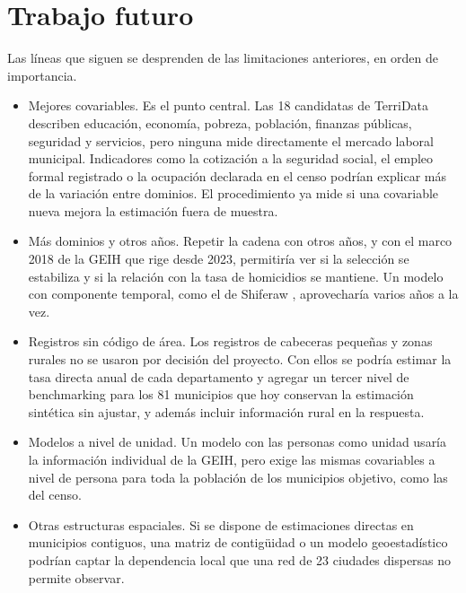 \section{Trabajo futuro}
\label{sec:dis_futuro}

Las líneas que siguen se desprenden de las limitaciones anteriores, en orden de importancia.

\begin{itemize}
    \item Mejores covariables. Es el punto central. Las 18 candidatas de TerriData describen educación, economía, pobreza, población, finanzas públicas, seguridad y servicios, pero ninguna mide directamente el mercado laboral municipal. Indicadores como la cotización a la seguridad social, el empleo formal registrado o la ocupación declarada en el censo podrían explicar más de la variación entre dominios. El procedimiento ya mide si una covariable nueva mejora la estimación fuera de muestra.
    \item Más dominios y otros años. Repetir la cadena con otros años, y con el marco 2018 de la GEIH que rige desde 2023, permitiría ver si la selección se estabiliza y si la relación con la tasa de homicidios se mantiene. Un modelo con componente temporal, como el de Shiferaw \cite[p.~4]{Shiferaw2025}, aprovecharía varios años a la vez.
    \item Registros sin código de área. Los registros de cabeceras pequeñas y zonas rurales no se usaron por decisión del proyecto. Con ellos se podría estimar la tasa directa anual de cada departamento y agregar un tercer nivel de benchmarking para los 81 municipios que hoy conservan la estimación sintética sin ajustar, y además incluir información rural en la respuesta.
    \item Modelos a nivel de unidad. Un modelo con las personas como unidad \cite{BatteseHarterFuller1988} usaría la información individual de la GEIH, pero exige las mismas covariables a nivel de persona para toda la población de los municipios objetivo, como las del censo.
    \item Otras estructuras espaciales. Si se dispone de estimaciones directas en municipios contiguos, una matriz de contigüidad o un modelo geoestadístico \cite{Pereira2021} podrían captar la dependencia local que una red de 23 ciudades dispersas no permite observar.
\end{itemize}
